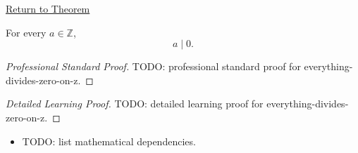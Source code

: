 \newpage
{}
\label{prf:everything-divides-zero-on-z}

\begin{remark*}[Return]
\hyperref[prop:everything-divides-zero-on-z]{Return to Theorem}
\end{remark*}

\begin{proposition*}
For every $a\in\mathbb{Z}$,
\[
a\mid 0.
\]
\end{proposition*}

\begin{proof}[Professional Standard Proof]
\LRAProofBodyStart
TODO: professional standard proof for everything-divides-zero-on-z.
\end{proof}

\begin{proof}[Detailed Learning Proof]
\LRAProofBodyStart
TODO: detailed learning proof for everything-divides-zero-on-z.
\end{proof}

\begin{remark*}
\end{remark*}

\begin{dependencies}
\begin{itemize}
  \item TODO: list mathematical dependencies.
\end{itemize}
\end{dependencies}

\clearpage
